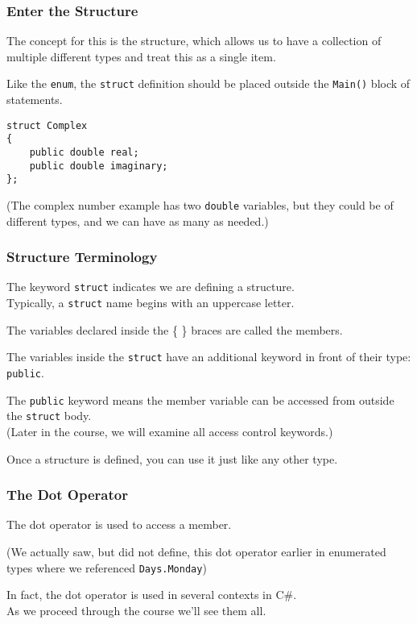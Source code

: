 \begin{frame}[fragile]
\frametitle{Enter the Structure}

The concept for this is the \alert{structure}, which allows us to have a collection of multiple different types and treat this as a single item.

Like the \texttt{enum}, the \texttt{struct} definition should be placed outside the \texttt{Main()} block of statements.

\begin{verbatim}
struct Complex
{
    public double real;
    public double imaginary;
};
\end{verbatim}

(The complex number example has two \texttt{double} variables, but they could be of different types, and we can have as many as needed.)

\end{frame}

\begin{frame}
\frametitle{Structure Terminology}
The keyword \texttt{struct} indicates we are defining a structure.\\
\quad Typically, a \texttt{struct} name begins with an uppercase letter.

The variables declared inside the \{ \} braces are called the \alert{members}.

The variables inside the \texttt{struct} have an additional keyword in front of their type: \texttt{public}.

The \texttt{public} keyword means the member variable can be accessed from outside the \texttt{struct} body.\\
(Later in the course, we will examine all access control keywords.)

Once a structure is defined, you can use it just like any other type.

\end{frame}

\begin{frame}
\frametitle{The Dot Operator}
The \alert{dot operator} is used to access a member.

(We actually saw, but did not define, this dot operator earlier in enumerated types where we referenced \texttt{Days.Monday})

In fact, the dot operator is used in several contexts in C\#.\\
\quad As we proceed through the course we'll see them all.

\end{frame}

